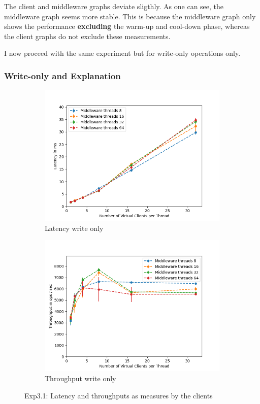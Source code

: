 \documentclass[11pt,a4paper]{article}
\begin{document}
The client and middleware graphs deviate sligthly.
As one can see, the middleware graph seems more stable.
This is because the middleware graph only shows the performance \textbf{excluding} the warm-up and cool-down phase, whereas the client graphs do not exclude these measurements.

I now proceed with the same experiment but for write-only operations only.

\subsubsection{Write-only and Explanation}

\begin{figure}[H]
\centering
\begin{subfigure}{.5\textwidth}
    \centering
    \includegraphics[width=\textwidth]{img/exp3_1/exp3_1__latency_client_write_1.png}
    \caption{Latency write only}
    \label{fig:mesh1}
\end{subfigure}%
\begin{subfigure}{.5\textwidth}
      \centering
    \includegraphics[width=\textwidth]{img/exp3_1/exp3_1__throughput_client_write_1.png}
    \caption{Throughput write only}
    \label{fig:mesh1}
\end{subfigure}
\caption{Exp3.1: Latency and throughputs as measures by the clients}
\label{fig:test}
\end{figure}
\end{document}
